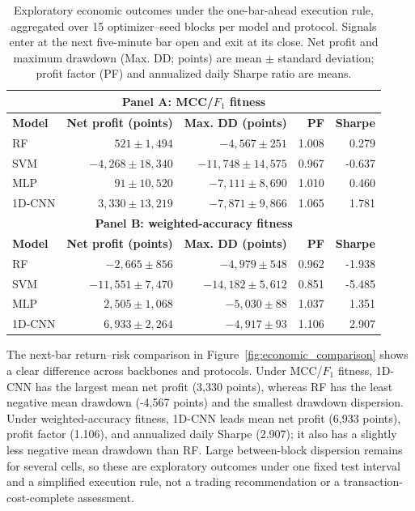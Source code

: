 \begin{table}[!htbp]
\centering
\caption{Exploratory economic outcomes under the one-bar-ahead execution rule, aggregated over 15 optimizer--seed blocks per model and protocol. Signals enter at the next five-minute bar open and exit at its close. Net profit and maximum drawdown (Max. DD; points) are mean $\pm$ standard deviation; profit factor (PF) and annualized daily Sharpe ratio are means.}
\label{tab:economic_summary}
\manuscripttablestyle
\begin{tabular}{lrrrr}\toprule
\multicolumn{5}{c}{\textbf{Panel A: MCC/$F_1$ fitness}}\\\midrule
\textbf{Model} & \textbf{Net profit (points)} & \textbf{Max. DD (points)} & \textbf{PF} & \textbf{Sharpe}\\\midrule
RF & $521\pm1{,}494$ & $-4{,}567\pm251$ & 1.008 & 0.279\\
SVM & $-4{,}268\pm18{,}340$ & $-11{,}748\pm14{,}575$ & 0.967 & -0.637\\
MLP & $91\pm10{,}520$ & $-7{,}111\pm8{,}690$ & 1.010 & 0.460\\
1D-CNN & $3{,}330\pm13{,}219$ & $-7{,}871\pm9{,}866$ & 1.065 & 1.781\\\midrule
\multicolumn{5}{c}{\textbf{Panel B: weighted-accuracy fitness}}\\\midrule
\textbf{Model} & \textbf{Net profit (points)} & \textbf{Max. DD (points)} & \textbf{PF} & \textbf{Sharpe}\\\midrule
RF & $-2{,}665\pm856$ & $-4{,}979\pm548$ & 0.962 & -1.938\\
SVM & $-11{,}551\pm7{,}470$ & $-14{,}182\pm5{,}612$ & 0.851 & -5.485\\
MLP & $2{,}505\pm1{,}068$ & $-5{,}030\pm88$ & 1.037 & 1.351\\
1D-CNN & $6{,}933\pm2{,}264$ & $-4{,}917\pm93$ & 1.106 & 2.907\\\bottomrule
\end{tabular}
\end{table}

The next-bar return--risk comparison in Figure~\ref{fig:economic_comparison} shows a clear difference across backbones and protocols. Under MCC/$F_1$ fitness, 1D-CNN has the largest mean net profit (3,330 points), whereas RF has the least negative mean drawdown (-4,567 points) and the smallest drawdown dispersion. Under weighted-accuracy fitness, 1D-CNN leads mean net profit (6,933 points), profit factor (1.106), and annualized daily Sharpe (2.907); it also has a slightly less negative mean drawdown than RF. Large between-block dispersion remains for several cells, so these are exploratory outcomes under one fixed test interval and a simplified execution rule, not a trading recommendation or a transaction-cost-complete assessment.


